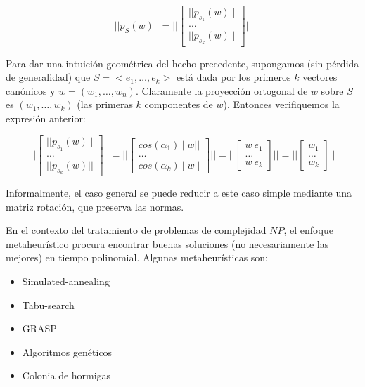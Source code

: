 \documentclass[10pt, a4paper, twocolumn]{article} %
\begin{document}
$$
||p_S(w)|| = ||\begin{bmatrix}
	||p_{s_1}(w)|| \\
	\dots \\
	||p_{s_k}(w)||
\end{bmatrix}||
$$

\smallskip

Para dar una intuición geométrica del hecho precedente, supongamos (sin 
pérdida de generalidad) que $S = <e_1, \dots, e_k>$ está dada por los 
primeros $k$ vectores canónicos y $w = (w_1, \dots, w_n)$. 
Claramente la proyección ortogonal de $w$ sobre $S$ es 
$(w_1, \dots, w_k)$ (las primeras $k$ componentes de $w$). Entonces 
verifiquemos la expresión anterior:

$$
||\begin{bmatrix}
	||p_{s_1}(w)|| \\	
	\dots \\
	||p_{s_k}(w)||
\end{bmatrix}|| = 
||\begin{bmatrix}
	cos(\alpha_1) \ ||w|| \\
	\dots \\
	cos(\alpha_k) \ ||w||
\end{bmatrix}|| = 
||\begin{bmatrix}
	w \ e_1 \\
	\dots \\
	w \ e_k
\end{bmatrix}|| =  
||\begin{bmatrix}
	w_1 \\
	\dots \\
	w_k
\end{bmatrix}||
$$

\smallskip

Informalmente, el caso general se puede reducir a este caso simple 
mediante una matriz rotación, que preserva las normas.

\bigskip


En el contexto del tratamiento de problemas de complejidad $NP$, el 
enfoque metaheurístico procura encontrar buenas soluciones (no 
necesariamente las mejores) en tiempo polinomial. Algunas 
metaheurísticas son:

\begin{itemize}
	\item Simulated-annealing
	\item Tabu-search
	\item GRASP
	\item Algoritmos genéticos
	\item Colonia de hormigas
\end{itemize}
\end{document}
